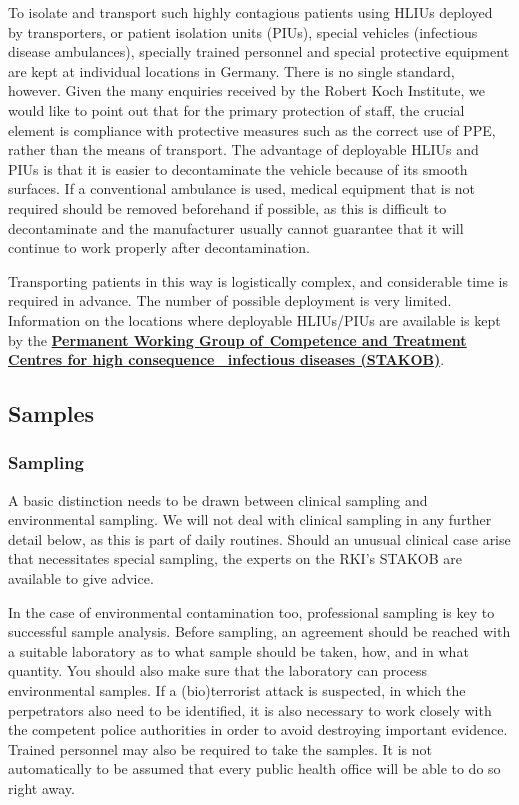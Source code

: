 \documentclass{article}
\begin{document}
To isolate and transport such highly contagious patients using HLIUs deployed by transporters, or patient isolation units (PIUs), special vehicles (infectious disease ambulances), specially trained personnel and special protective equipment are kept at individual locations in Germany. There is no single standard, however. Given the many enquiries received by the Robert Koch Institute, we would like to point out that for the primary protection of staff, the crucial element is compliance with protective measures such as the correct use of PPE, rather than the means of transport. The advantage of deployable HLIUs and PIUs is that it is easier to decontaminate the vehicle because of its smooth surfaces. If a conventional ambulance is used, medical equipment that is not required should be removed beforehand if possible, as this is difficult to decontaminate and the manufacturer usually cannot guarantee that it will continue to work properly after decontamination.


Transporting patients in this way is logistically complex, and considerable time is required in advance. The number of possible deployment is very limited. Information on the locations where deployable HLIUs/PIUs are available is kept by the \textbf{\href{https://www.rki.de/DE/Content/Kommissionen/Stakob/Stakob_node.html}{Permanent Working Group of}}\href{https://www.rki.de/DE/Content/Kommissionen/Stakob/Stakob_node.html}{ }\textbf{\href{https://www.rki.de/DE/Content/Kommissionen/Stakob/Stakob_node.html}{Competence and Treatment Centres for high consequence  infectious diseases (STAKOB)}}.


\subsection{Samples}\label{H6855299}



\subsubsection{Sampling}\label{H9282072}



A basic distinction needs to be drawn between clinical sampling and environmental sampling. We will not deal with clinical sampling in any further detail below, as this is part of daily routines. Should an unusual clinical case arise that necessitates special sampling, the experts on the RKI's STAKOB are available to give advice.


In the case of environmental contamination too, professional sampling is key to successful sample analysis. Before sampling, an agreement should be reached with a suitable laboratory as to what sample should be taken, how, and in what quantity. You should also make sure that the laboratory can process environmental samples. If a (bio)terrorist attack is suspected, in which the perpetrators also need to be identified, it is also necessary to work closely with the competent police authorities in order to avoid destroying important evidence. Trained personnel may also be required to take the samples. It is not automatically to be assumed that every public health office will be able to do so right away.
\end{document}
